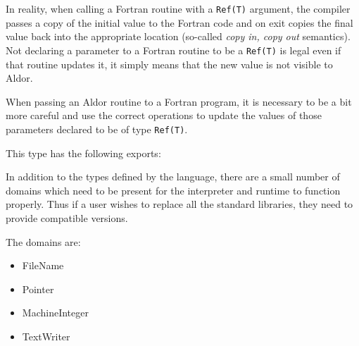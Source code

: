 In reality, when calling a Fortran routine with a {\tt Ref(T)} argument, 
the compiler passes a copy of the initial value to the Fortran code and
on exit copies the final value back into the appropriate location
(so-called {\em copy in, copy out} semantics).  Not declaring a parameter
to a Fortran routine to be a {\tt Ref(T)} is legal even if that routine
updates it, it simply means that the new value is not visible to Aldor.

When passing an Aldor routine to a Fortran program, it is necessary to
be a bit more careful and use the correct operations to update the values
of those parameters declared to be of type {\tt Ref(T)}.

This type has the following exports:


%

In addition to the types defined by the language, there are a small number
of domains which need to be present for the interpreter and runtime to
function properly.  Thus if a user wishes to replace all the standard
libraries, they need to provide compatible versions.

The domains are:
\begin{itemize}
\item FileName
\item Pointer
\item MachineInteger
\item TextWriter
\end{itemize}



